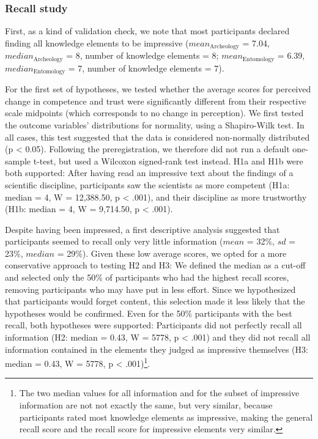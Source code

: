 \documentclass[
  english,
  doc,floatsintext]{apa6}
\begin{document}
\subsubsection{Recall study}\label{recall-study-1}

First, as a kind of validation check, we note that most participants declared finding all knowledge elements to be impressive (\(mean_{\text{Archeology}}\) = 7.04, \(median_{\text{Archeology}}\) = 8, number of knowledge elements = 8; \(mean_{\text{Entomology}}\) = 6.39, \(median_{\text{Entomology}}\) = 7, number of knowledge elements = 7).

For the first set of hypotheses, we tested whether the average scores for perceived change in competence and trust were significantly different from their respective scale midpoints (which corresponds to no change in perception). We first tested the outcome variables' distributions for normality, using a Shapiro-Wilk test. In all cases, this test suggested that the data is considered non-normally distributed (p \textless{} 0.05). Following the preregistration, we therefore did not run a default one-sample t-test, but used a Wilcoxon signed-rank test instead. H1a and H1b were both supported: After having read an impressive text about the findings of a scientific discipline, participants saw the scientists as more competent (H1a: median = 4, W = 12,388.50, p \textless{} .001), and their discipline as more trustworthy (H1b: median = 4, W = 9,714.50, p \textless{} .001).

Despite having been impressed, a first descriptive analysis suggested that participants seemed to recall only very little information (\(mean\) = 32\%, \(sd\) = 23\%, \(median\) = 29\%). Given these low average scores, we opted for a more conservative approach to testing H2 and H3: We defined the median as a cut-off and selected only the 50\% of participants who had the highest recall scores, removing participants who may have put in less effort. Since we hypothesized that participants would forget content, this selection made it less likely that the hypotheses would be confirmed. Even for the 50\% participants with the best recall, both hypotheses were supported: Participants did not perfectly recall all information (H2: median = 0.43, W = 5778, p \textless{} .001) and they did not recall all information contained in the elements they judged as impressive themselves (H3: median = 0.43, W = 5778, p \textless{} .001)\footnote{The two median values for all information and for the subset of impressive information are not not exactly the same, but very similar, because participants rated most knowledge elements as impressive, making the general recall score and the recall score for impressive elements very similar.}.
\end{document}
